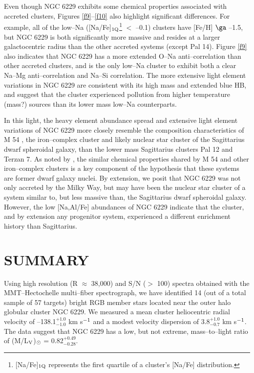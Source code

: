 \documentclass[12pt,preprint]{emulateapj}
\begin{document}
Even though NGC 6229 exhibits some chemical properties associated with accreted
clusters, Figures \ref{f9}--\ref{f10} also highlight significant differences.
For example, all of the low--Na ([Na/Fe]$_{\rm 1Q}$\footnote{[Na/Fe]$_{\rm 1Q}$
represents the first quartile of a cluster's [Na/Fe] distribution.} $<$ --0.1)
clusters have [Fe/H] $\ga$ --1.5, but NGC 6229 is both significantly more
massive and resides at a larger galactocentric radius than the other accreted
systems (except Pal 14).  Figure \ref{f9} also indicates that NGC 6229 has a
more extended O--Na anti--correlation than other accreted clusters, and is the
only low--Na cluster to exhibit both a clear Na--Mg anti--correlation and 
Na--Si correlation.  The more extensive light element variations in NGC 6229
are consistent with its high mass and extended blue HB, and suggest that the
cluster experienced pollution from higher temperature (mass?) sources than its 
lower mass low--Na counterparts.

In this light, the heavy element abundance spread and extensive light element 
variations of NGC 6229 more closely resemble the composition characteristics
of M 54 \citep[e.g.,][]{Carretta10a}, the iron--complex cluster and likely
nuclear star cluster of the Sagittarius dwarf spheroidal galaxy, than the lower
mass Sagittarius clusters Pal 12 and Terzan 7.  As noted by \citet{DaCosta16},
the similar chemical properties shared by M 54 and other iron--complex clusters
is a key component of the hypothesis that these systems are former dwarf galaxy
nuclei.  By extension, we posit that NGC 6229 was not only accreted by the
Milky Way, but may have been the nuclear star cluster of a system similar to,
but less massive than, the Sagittarius dwarf spheroidal galaxy.  However, the
low [Na,Al/Fe] abundances of NGC 6229 indicate that the cluster, and by
extension any progenitor system, experienced a different enrichment history
than Sagittarius.

\section{SUMMARY}

Using high resolution (R $\approx$ 38,000) and S/N ($>$ 100) spectra obtained
with the MMT--Hectochelle multi--fiber spectrograph, we have identified 14
(out of a total sample of 57 targets) bright RGB member stars located near the 
outer halo globular cluster NGC 6229.  We measured a mean cluster heliocentric 
radial velocity of --138.1$_{-1.0}^{+1.0}$ km s$^{\rm -1}$ and a modest velocity
dispersion of 3.8$_{-0.7}^{+1.0}$ km s$^{\rm -1}$.  The data suggest that
NGC 6229 has a low, but not extreme, mass--to--light ratio of 
(M/L$_{\rm V}$)$_{\rm \odot}$ = 0.82$_{-0.28}^{+0.49}$.
\end{document}
